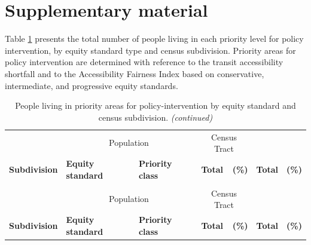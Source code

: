 \documentclass[preprint, 3p,
authoryear]{elsarticle} %
\begin{document}
\section{Supplementary material}\label{supplementary-material}

Table \ref{tab:pcsd_summary} presents the total number of people living
in each priority level for policy intervention, by equity standard type
and census subdivision. Priority areas for policy intervention are
determined with reference to the transit accessibility shortfall and to
the Accessibility Fairness Index based on conservative, intermediate,
and progressive equity standards.

\begingroup\fontsize{10}{12}\selectfont

\begin{longtable}[t]{>{\raggedright\arraybackslash}p{5cm}llrrrr}
\caption{\label{tab:unnamed-chunk-1}\label{tab:pcsd_summary}People living in priority areas for policy-intervention by equity standard and census subdivision.}\\
\toprule
\multicolumn{3}{c}{ } & \multicolumn{2}{c}{Population} & \multicolumn{2}{c}{Census Tract} \\
\cmidrule(l{3pt}r{3pt}){4-5} \cmidrule(l{3pt}r{3pt}){6-7}
\textbf{Subdivision} & \textbf{Equity standard} & \textbf{Priority class} & \textbf{Total} & \textbf{(\%)} & \textbf{Total} & \textbf{(\%)}\\
\midrule
\endfirsthead
\caption[]{\label{tab:pcsd_summary}People living in priority areas for policy-intervention by equity standard and census subdivision. \textit{(continued)}}\\
\toprule
\multicolumn{3}{c}{ } & \multicolumn{2}{c}{Population} & \multicolumn{2}{c}{Census Tract} \\
\cmidrule(l{3pt}r{3pt}){4-5} \cmidrule(l{3pt}r{3pt}){6-7}
\textbf{Subdivision} & \textbf{Equity standard} & \textbf{Priority class} & \textbf{Total} & \textbf{(\%)} & \textbf{Total} & \textbf{(\%)}\\
\midrule
\endhead


\end{longtable}
\end{document}
